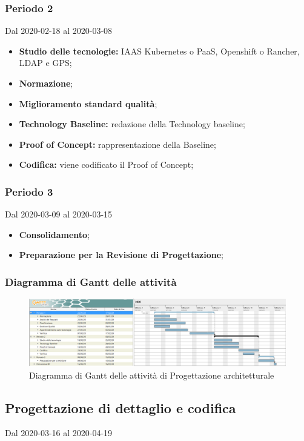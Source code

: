 \subsubsection{Periodo 2} 
Dal 2020-02-18 al 2020-03-08
\begin{itemize}
	\item \textbf{Studio delle tecnologie:} IAAS Kubernetes o PaaS, Openshift o Rancher, LDAP e GPS;
	\item \textbf{Normazione};
	\item \textbf{Miglioramento standard qualità};
	\item \textbf{Technology Baseline:} redazione della Technology baseline;
	\item \textbf{Proof of Concept:} rappresentazione della Baseline;
	\item \textbf{Codifica:} viene codificato il Proof of Concept;
\end{itemize}
\subsubsection{Periodo 3} 
Dal 2020-03-09 al 2020-03-15
\begin{itemize}
	\item \textbf{Consolidamento};
	\item \textbf{Preparazione per la Revisione di Progettazione};
\end{itemize}
\subsubsection{Diagramma di Gantt delle attività}
\begin{figure}[h]
	\includegraphics[scale=0.45]{sezioni/DiagrammiGantt/ProgettazioneArchitetturale.png}
	\caption{Diagramma di Gantt delle attività di Progettazione architetturale}
\end{figure}

\subsection{Progettazione di dettaglio e codifica}
Dal 2020-03-16 al 2020-04-19\\



